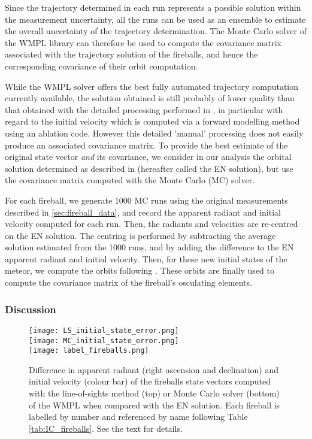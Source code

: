 \documentclass[letters,a4paper,fleqn,usenatbib]{mnras}
\begin{document}
Since the trajectory determined in each run represents a possible solution within the measurement uncertainty, all the runs can be used as an ensemble to estimate the overall uncertainty of the trajectory determination. The Monte Carlo solver of the WMPL library can therefore be used to compute the covariance matrix associated with the trajectory solution of the fireballs, and hence the corresponding covariance of their orbit computation. 

While the WMPL solver offers the best fully automated trajectory computation currently available, the solution obtained is still probably of lower quality than that obtained with the detailed processing performed in \cite{Spurny2017}, in particular with regard to the initial velocity which is computed via a forward modelling method using an ablation code. However this detailed 'manual' processing does not easily produce an associated covariance matrix.  To provide the best estimate of the original state vector {\it and} its covariance, we consider in our analysis the orbital solution determined as described in \cite{Spurny2017} (hereafter called the EN solution), but use the covariance matrix computed with the Monte Carlo (MC) solver. 

For each fireball, we generate 1000 MC runs using the original measurements described in \ref{sec:fireball_data}, and record the apparent radiant and initial velocity computed for each run. Then, the radiants and velocities are re-centred on the EN solution. The centring is performed by subtracting the average solution estimated from the 1000 runs, and by adding the difference to the EN apparent radiant and initial velocity. Then, for these new initial states of the meteor, we compute the orbits following \cite{Vida2019}. These orbits are finally used to compute the covariance matrix of the fireball's osculating elements. 

\subsubsection{Discussion}


 \begin{figure}
     \centering
     \texttt{[image: LS\_initial\_state\_error.png]}\\
     \texttt{[image: MC\_initial\_state\_error.png]}\\[0.2cm] 
    \texttt{[image: label\_fireballs.png]}
     \caption{Difference in apparent radiant (right ascension and declination) and initial velocity (colour bar) of the fireballs state vectors computed with the line-of-sights method (top) or Monte Carlo solver (bottom) of the WMPL when compared with the EN solution. Each fireball is labelled by number and referenced by name following Table \ref{tab:IC_fireballs}. See the text for details. }
     \label{fig:error_fireballs}
 \end{figure}
\end{document}
